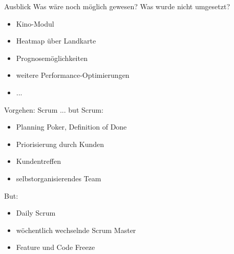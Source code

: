 \begin{frame}{Ausblick}
Was wäre noch möglich gewesen? Was wurde nicht umgesetzt?
\\
\begin{itemize}
    \item Kino-Modul
    \item Heatmap über Landkarte
    \item Prognosemöglichkeiten
    \item weitere Performance-Optimierungen
    \item ...
\end{itemize}
\end{frame}
\begin{frame}{Vorgehen: Scrum ... but}
Scrum:
\begin{itemize}
    \item Planning Poker, Definition of Done
    \item Priorisierung durch Kunden
    \item Kundentreffen
    \item selbstorganisierendes Team
\end{itemize}
But:
\begin{itemize}
    \item Daily Scrum
    \item wöchentlich wechselnde Scrum Master
    \item Feature und Code Freeze
\end{itemize}
\end{frame}
